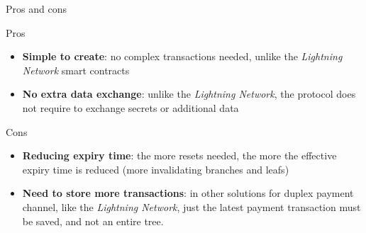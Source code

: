 \documentclass{beamer}
\begin{document}
\begin{frame}{Pros and cons}
 \begin{exampleblock}{Pros}
  \begin{itemize}[<+->]
   \item \textbf{Simple to create}: no complex transactions needed, unlike the \textit{Lightning Network} smart contracts
   \item \textbf{No extra data exchange}: unlike the \textit{Lightning Network}, the protocol does not require to exchange secrets or additional data
  \end{itemize}
 \end{exampleblock}
 \pause
 \begin{alertblock}{Cons}
  \begin{itemize}[<+->]
   \item \textbf{Reducing expiry time}: the more resets needed, the more the effective expiry time is reduced (more invalidating branches and leafs)
   \item \textbf{Need to store more transactions}: in other solutions for duplex payment channel, like the \textit{Lightning Network}, just the latest payment transaction must be saved, and not an entire tree.
  \end{itemize}
 \end{alertblock}
\end{frame}
\end{document}
